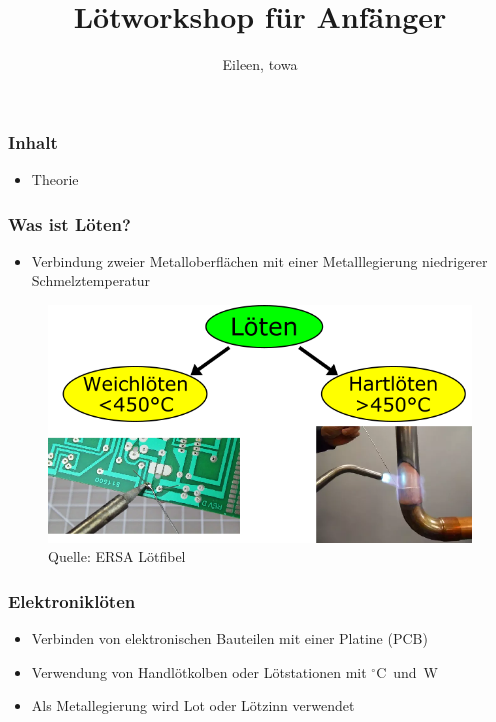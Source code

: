 \documentclass[10pt]{beamer}
\title[soldering-workshop] %
{Lötworkshop für Anfänger}
\author{Eileen, towa}
\begin{document}
    \maketitle
    
    \begin{frame}
    \frametitle{Inhalt}
    \begin{itemize}
    	\item{Theorie}
    \end{itemize}
	\end{frame}
    
    \begin{frame}
    \frametitle{Was ist Löten?}
    \begin{itemize}
    	\item{Verbindung zweier Metalloberflächen mit einer Metalllegierung niedrigerer Schmelztemperatur}
    \end{itemize}
	\begin{figure}[hbtp]
		\centering
		\includegraphics[width=\linewidth*2/3]{images/weich_hartloeten.png}
		\caption{Quelle: ERSA Lötfibel}
	\end{figure}
	\end{frame}

	\begin{frame}
	\frametitle{Elektroniklöten}
	\begin{itemize}
		\item{Verbinden von elektronischen Bauteilen mit einer Platine (PCB)}
		\item{Verwendung von Handlötkolben oder Lötstationen mit \unit[300-400]{$^\circ$C} und \unit[30-80]{W}}
		\item{Als Metallegierung wird Lot oder Lötzinn verwendet}
	\end{itemize}
	\end{frame}
\end{document}
